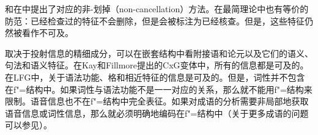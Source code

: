 \citet[]{Higginbotham85a}和\citet{Winkler97a}在\gbtc 中提出了对应的非-划掉（non-cancellation）方法。在最简理论中也有等价的防范：已经检查过的特征不会删除，但是会被标注为已经核查\citep[]{Stabler2010b}。但是，这些特征仍然被看作不可及。\label{page-non-cancellation-end}

取决于投射信息的精细成分，可以在嵌套结构中看附接语和论元以及它们的语义、句法和语义特征。在Kay和Fillmore提出的CxG变体中，所有的信息都是可及的。在LFG中，关于语法功能、格和相近特征的信息是可及的。但是，词性并不包含在f"=结构中。如果词性与语法功能不是一一对应的关系，那么就不能用f"=结构来限制。语音信息也不在f"=结构中完全表征。如果对成语的分析需要非局部地获取语音信息或词性信息，那么就必须明确地编码在f"=结构中（关于更多成语的问题可以参见）。


